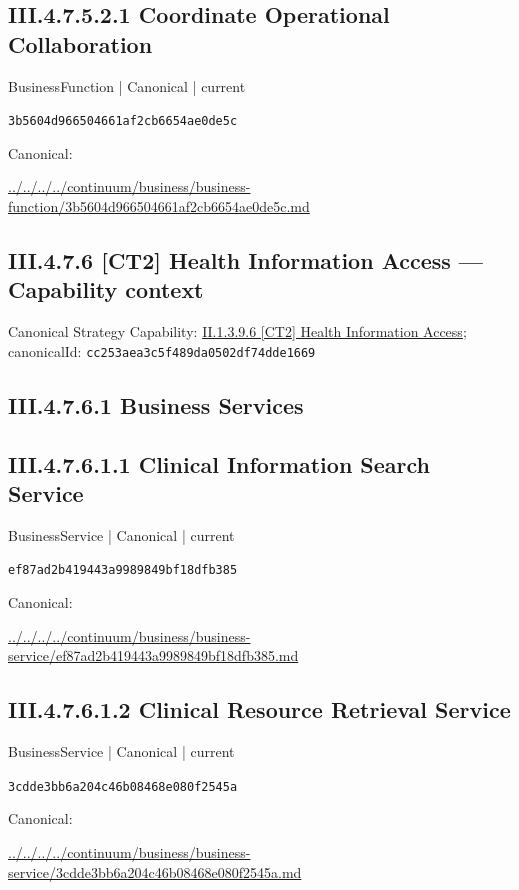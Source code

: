 \documentclass[10pt,a4paper]{article}
\begin{document}
\subsection*{III.4.7.5.2.1 Coordinate Operational Collaboration}
\label{element-3b5604d966504661af2cb6654ae0de5c}
{\small BusinessFunction | Canonical | current}\par
\texttt{3b5604d966504661af2cb6654ae0de5c}\par
Canonical: \par
{\footnotesize\url{../../../../continuum/business/business-function/3b5604d966504661af2cb6654ae0de5c.md}}\par
\subsection*{III.4.7.6 [CT2] Health Information Access — Capability context}
Canonical Strategy Capability: \hyperref[element-cc253aea3c5f489da0502df74dde1669]{II.1.3.9.6 [CT2] Health Information Access}; canonicalId: \texttt{cc253aea3c5f489da0502df74dde1669}\par
\subsection*{III.4.7.6.1 Business Services}
\subsection*{III.4.7.6.1.1 Clinical Information Search Service}
\label{element-ef87ad2b419443a9989849bf18dfb385}
{\small BusinessService | Canonical | current}\par
\texttt{ef87ad2b419443a9989849bf18dfb385}\par
Canonical: \par
{\footnotesize\url{../../../../continuum/business/business-service/ef87ad2b419443a9989849bf18dfb385.md}}\par
\subsection*{III.4.7.6.1.2 Clinical Resource Retrieval Service}
\label{element-3cdde3bb6a204c46b08468e080f2545a}
{\small BusinessService | Canonical | current}\par
\texttt{3cdde3bb6a204c46b08468e080f2545a}\par
Canonical: \par
{\footnotesize\url{../../../../continuum/business/business-service/3cdde3bb6a204c46b08468e080f2545a.md}}\par
\end{document}
